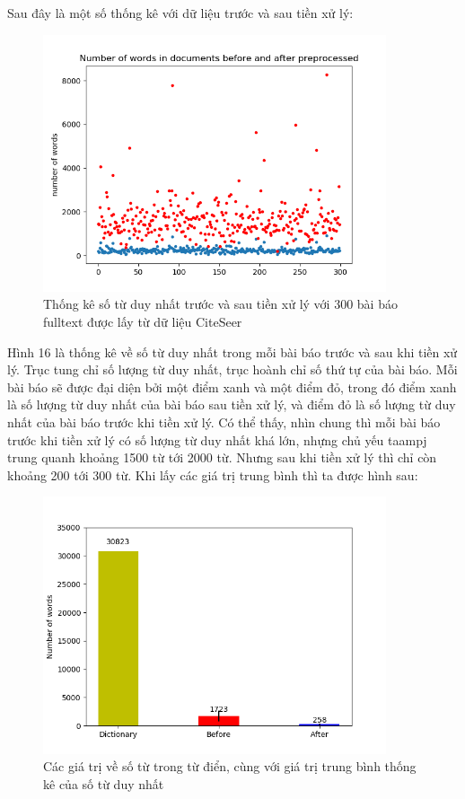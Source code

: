 \documentclass[12pt,a4paper]{article}
\begin{document}
\noindent
Sau đây là một số thống kê với dữ liệu trước và sau tiền xử lý:

\begin{figure}[h]
    \centering
    \captionsetup{justification=centering}
    \includegraphics[width=0.9\textwidth]{num_words}
    \caption{Thống kê số từ duy nhất trước và sau tiền xử lý với 300 bài báo fulltext được lấy từ dữ liệu CiteSeer}
    \label{fig:num_words}
\end{figure}
	
\noindent
Hình 16 là thống kê về số từ duy nhất trong mỗi bài báo trước và sau khi tiền xử lý. Trục tung chỉ số lượng từ duy nhất, trục hoành chỉ số thứ tự của bài báo. Mỗi bài báo sẽ được đại diện bởi một điểm xanh và một điểm đỏ, trong đó điểm xanh là số lượng từ duy nhất của bài báo sau tiền xử lý, và điểm đỏ là số lượng từ duy nhất của bài báo trước khi tiền xử lý. Có thể thấy, nhìn chung thì mỗi bài báo trước khi tiền xử lý có số lượng từ duy nhất khá lớn, nhựng chủ yếu taampj trung quanh khoảng 1500 từ tới 2000 từ. Nhưng sau khi tiền xử lý thì chỉ còn khoảng 200 tới 300 từ. Khi lấy các giá trị trung bình thì ta được hình sau:

\begin{figure}[h]
    \centering
    \captionsetup{justification=centering}
    \includegraphics[width=0.9\textwidth]{means}
    \caption{Các giá trị về số từ trong từ điển, cùng với giá trị trung bình thống kê của số từ duy nhất}
    \label{fig:means}
\end{figure}
\end{document}
